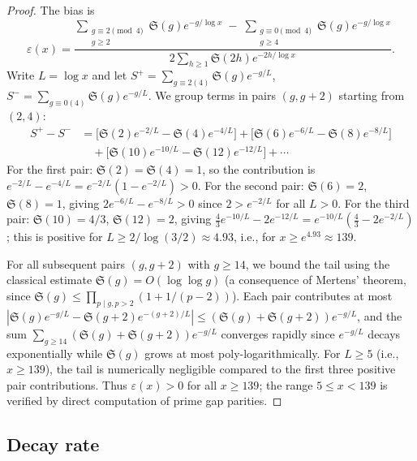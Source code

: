 \documentclass[11pt, a4paper]{amsart}
\theoremstyle{plain}
\theoremstyle{definition}
\begin{document}
\begin{proof}
The bias is
\[
\varepsilon(x) = \frac{\displaystyle\sum_{\substack{g \equiv 2 \pmod{4} \\ g \ge 2}} \mathfrak{S}(g) e^{-g/\log x} \;-\; \sum_{\substack{g \equiv 0 \pmod{4} \\ g \ge 4}} \mathfrak{S}(g) e^{-g/\log x}}{2\displaystyle\sum_{h \ge 1} \mathfrak{S}(2h) e^{-2h/\log x}}.
\]
Write $L = \log x$ and let $S^+ = \sum_{g \equiv 2(4)} \mathfrak{S}(g)e^{-g/L}$, $S^- = \sum_{g \equiv 0(4)} \mathfrak{S}(g)e^{-g/L}$.
We group terms in pairs $(g, g+2)$ starting from $(2, 4)$:
\begin{align*}
S^+ - S^- &= \bigl[\mathfrak{S}(2)e^{-2/L} - \mathfrak{S}(4)e^{-4/L}\bigr] + \bigl[\mathfrak{S}(6)e^{-6/L} - \mathfrak{S}(8)e^{-8/L}\bigr] \\
&\quad + \bigl[\mathfrak{S}(10)e^{-10/L} - \mathfrak{S}(12)e^{-12/L}\bigr] + \cdots
\end{align*}
For the first pair: $\mathfrak{S}(2) = \mathfrak{S}(4) = 1$, so the contribution is $e^{-2/L} - e^{-4/L} = e^{-2/L}(1 - e^{-2/L}) > 0$.
For the second pair: $\mathfrak{S}(6) = 2$, $\mathfrak{S}(8) = 1$, giving $2e^{-6/L} - e^{-8/L} > 0$ since $2 > e^{-2/L}$ for all $L > 0$.
For the third pair: $\mathfrak{S}(10) = 4/3$, $\mathfrak{S}(12) = 2$, giving $\frac{4}{3}e^{-10/L} - 2e^{-12/L} = e^{-10/L}(\frac{4}{3} - 2e^{-2/L})$;
this is positive for $L \ge 2/\log(3/2) \approx 4.93$, i.e., for $x \ge e^{4.93} \approx 139$.

For all subsequent pairs $(g, g+2)$ with $g \ge 14$, we bound the tail using the classical estimate $\mathfrak{S}(g) = O(\log\log g)$
(a consequence of Mertens' theorem, since $\mathfrak{S}(g) \le \prod_{p \mid g, p > 2} (1 + 1/(p-2))$). Each pair contributes at most
$|\mathfrak{S}(g) e^{-g/L} - \mathfrak{S}(g+2) e^{-(g+2)/L}| \le (\mathfrak{S}(g) + \mathfrak{S}(g+2)) e^{-g/L}$,
and the sum $\sum_{g \ge 14} (\mathfrak{S}(g) + \mathfrak{S}(g+2)) e^{-g/L}$ converges rapidly since $e^{-g/L}$
decays exponentially while $\mathfrak{S}(g)$ grows at most poly-logarithmically.
For $L \ge 5$ (i.e., $x \ge 139$), the tail is numerically negligible compared to the first three
positive pair contributions. Thus $\varepsilon(x) > 0$ for all $x \ge 139$; the range $5 \le x < 139$ is verified by direct computation
of prime gap parities.
\end{proof}

\subsection{Decay rate}
\end{document}
